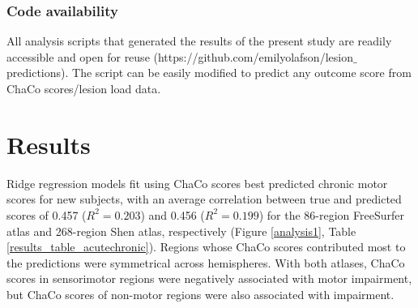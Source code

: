 \documentclass[10pt]{article}
\begin{document}
\subsubsection*{Code availability}
All analysis scripts that generated the results of the present study are readily accessible and open for reuse (https://github.com/emilyolafson/lesion$\_$predictions). The script can be easily modified to predict any outcome score from ChaCo scores/lesion load data.

\section{Results}

Ridge regression models fit using ChaCo scores best predicted chronic motor scores for new subjects, with an average correlation between true and predicted scores of 0.457 ($R^2 = 0.203$) and 0.456 ($R^2 = 0.199$) for the 86-region FreeSurfer atlas and 268-region Shen atlas, respectively (Figure \ref{analysis1}, Table \ref{results_table_acutechronic}). Regions whose ChaCo scores contributed most to the predictions were symmetrical across hemispheres. With both atlases, ChaCo scores in sensorimotor regions were negatively associated with motor impairment, but ChaCo scores of non-motor regions were also associated with impairment. 
\end{document}
